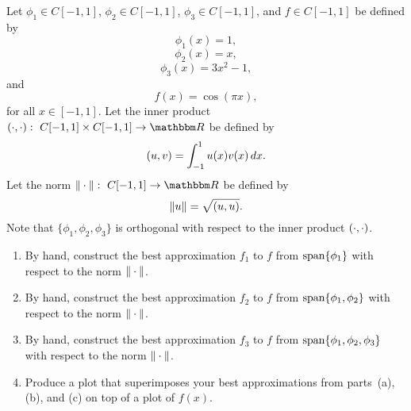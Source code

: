
Let $\phi_1\in C[-1,1]$, $\phi_2\in C[-1,1]$, $\phi_3\in C[-1,1]$, and $f\in C[-1,1]$ be defined by
\[
\phi_1(x) = 1,
\]
\[
\phi_2(x) = x,
\]
\[
\phi_3(x) = 3x^2-1,
\]
and
\[
f(x) = \cos(\pi x),
\]
for all $x\in[-1,1]$. Let the inner product $\ip{\cdot,\cdot}:\mbox{ }C[-1,1]\times C[-1,1]\rightarrow\R$ be defined by
\[
(u,v) = \int_{-1}^1 u(x)v(x)\, dx.
\]
Let the norm $\norm{\cdot}:\mbox{ }C[-1,1]\rightarrow\R$ be defined by
\[
\|u\| = \sqrt{(u,u)}.
\]
Note that $\{\phi_1,\phi_2,\phi_3\}$ is orthogonal with respect to the inner product $(\cdot,\cdot)$.
\\
\begin{enumerate}
\item By hand, construct the best approximation $f_1$ to $f$ from ${\rm span}\{\phi_1\}$ with respect to the norm $\|\cdot\|$.
\\
\item By hand, construct the best approximation $f_2$ to $f$ from ${\rm span}\{\phi_1,\phi_2\}$ with respect to the norm $\|\cdot\|$.
\\
\item By hand, construct the best approximation $f_3$ to $f$ from ${\rm span}\{\phi_1,\phi_2,\phi_3\}$ with respect to the norm $\|\cdot\|$.
\\
\item  Produce a plot that superimposes your best approximations from parts~(a), (b), and (c) on top of a plot of $f(x)$.
\end{enumerate}




